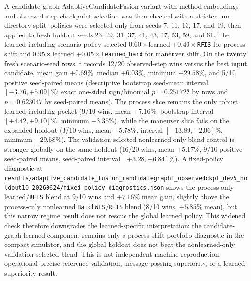 \documentclass{article}
\begin{document}
A candidate-graph AdaptiveCandidateFusion variant with method embeddings and observed-step checkpoint selection was then checked with a stricter run-directory split: policies were selected only from seeds 7, 11, 13, 17, and 19, then applied to fresh holdout seeds 23, 29, 31, 37, 41, 43, 47, 53, 59, and 61. The learned-including scenario policy selected \(0.60\times\)learned \(+0.40\times\)\texttt{RFIS} for process shift and \(0.95\times\)learned \(+0.05\times\)\texttt{learned\_hard} for maneuver shift. On the twenty fresh scenario-seed rows it records 12/20 observed-step wins versus the best input candidate, mean gain \(+0.69\)\%, median \(+6.03\)\%, minimum \(-29.58\)\%, and 5/10 positive seed-paired means (descriptive bootstrap seed-mean interval \([-3.76,+5.09]\)\%; exact one-sided sign/binomial \(p=0.251722\) by rows and \(p=0.623047\) by seed-paired means). The process slice remains the only robust learned-including pocket (9/10 wins, mean \(+7.16\)\%, bootstrap interval \([+4.42,+9.10]\)\%, minimum \(-3.35\)\%), while the maneuver slice fails on the expanded holdout (3/10 wins, mean \(-5.78\)\%, interval \([-13.89,+2.06]\)\%, minimum \(-29.58\)\%). The validation-selected nonlearned-only blend control is stronger globally on the same holdout (16/20 wins, mean \(+5.17\)\%, 9/10 positive seed-paired means, seed-paired interval \([+3.28,+6.84]\)\%). A fixed-policy diagnostic at \nolinkurl{results/adaptive_candidate_fusion_candidategraph1_observedckpt_dev5_holdout10_20260624/fixed_policy_diagnostics.json} shows the process-only learned/\texttt{RFIS} blend at 9/10 wins and \(+7.16\)\% mean gain, slightly above the process-only nonlearned \texttt{BatchWLS}/\texttt{RFIS} blend (8/10 wins, \(+5.85\)\% mean), but this narrow regime result does not rescue the global learned policy. This widened check therefore downgrades the learned-specific interpretation: the candidate-graph learned component remains only a process-shift portfolio diagnostic in the compact simulator, and the global holdout does not beat the nonlearned-only validation-selected blend. This is not independent-machine reproduction, operational precise-reference validation, message-passing superiority, or a learned-superiority result.
\end{document}
